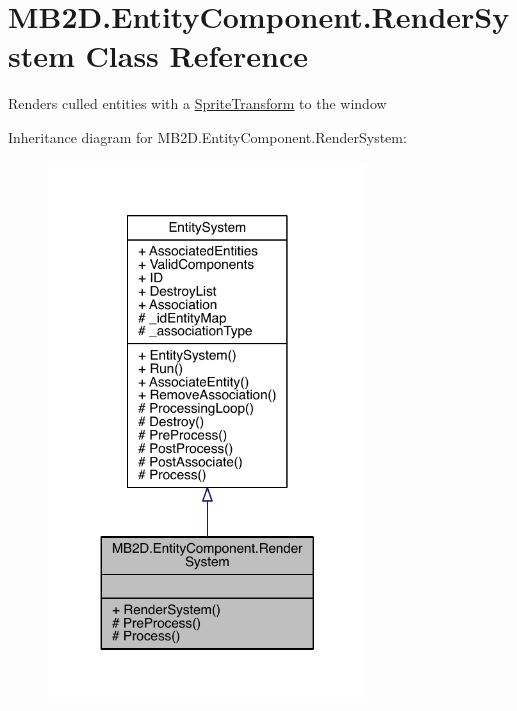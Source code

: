 \hypertarget{class_m_b2_d_1_1_entity_component_1_1_render_system}{}\section{M\+B2\+D.\+Entity\+Component.\+Render\+System Class Reference}
\label{class_m_b2_d_1_1_entity_component_1_1_render_system}


Renders culled entities with a \hyperlink{class_m_b2_d_1_1_entity_component_1_1_sprite_transform}{Sprite\+Transform} to the window  




Inheritance diagram for M\+B2\+D.\+Entity\+Component.\+Render\+System\+:
\nopagebreak
\begin{figure}[H]
\begin{center}
\leavevmode
\includegraphics[width=239pt]{class_m_b2_d_1_1_entity_component_1_1_render_system__inherit__graph}
\end{center}
\end{figure}


